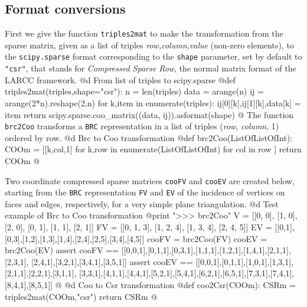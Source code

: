 \documentclass[11pt,oneside]{article}	%
\begin{document}
\subsection{Format conversions}

First we give the function \texttt{triples2mat} to make the transformation from the sparse matrix, given as a list of triples \emph{row,column,value} (non-zero elements), to the \texttt{scipy.sparse} format corresponding to the \texttt{shape} parameter, set by default to \texttt{"csr"}, that stands for \emph{Compressed Sparse Row}, the normal matrix format of the LARCC framework. 
@d From list of triples to scipy.sparse
@{def triples2mat(triples,shape="csr"):
    n = len(triples)
    data = arange(n)
    ij = arange(2*n).reshape(2,n)
    for k,item in enumerate(triples):
        ij[0][k],ij[1][k],data[k] = item
    return scipy.sparse.coo_matrix((data, ij)).asformat(shape)
@}
The function \texttt{brc2Coo} transforms a \texttt{BRC} representation in a list of triples (\emph{row}, \emph{column}, 1) ordered by row.
@d Brc to Coo transformation
@{def brc2Coo(ListOfListOfInt):
    COOm = [[k,col,1] for k,row in enumerate(ListOfListOfInt)
            for col in row ]
    return COOm
@}

Two coordinate compressed sparse matrices \texttt{cooFV} and \texttt{cooEV} are created below, starting from the \texttt{BRC} representation \texttt{FV} and \texttt{EV} of the incidence of vertices on faces and edges, respectively, for a very simple plane triangulation.
@d Test example of Brc to Coo transformation
@{print "\n>>> brc2Coo"
V = [[0, 0], [1, 0], [2, 0], [0, 1], [1, 1], [2, 1]]
FV = [[0, 1, 3], [1, 2, 4], [1, 3, 4], [2, 4, 5]]
EV = [[0,1],[0,3],[1,2],[1,3],[1,4],[2,4],[2,5],[3,4],[4,5]]
cooFV = brc2Coo(FV)
cooEV = brc2Coo(EV)
assert cooFV == [[0,0,1],[0,1,1],[0,3,1],[1,1,1],[1,2,1],[1,4,1],[2,1,1],
[2,3,1], [2,4,1],[3,2,1],[3,4,1],[3,5,1]]
assert cooEV == [[0,0,1],[0,1,1],[1,0,1],[1,3,1],[2,1,1],[2,2,1],[3,1,1],
[3,3,1],[4,1,1],[4,4,1],[5,2,1],[5,4,1],[6,2,1],[6,5,1],[7,3,1],[7,4,1],
[8,4,1],[8,5,1]]
@}
@d Coo to Csr transformation
@{def coo2Csr(COOm):
    CSRm = triples2mat(COOm,"csr")
    return CSRm
@}
\end{document}

